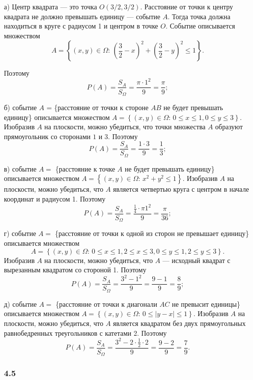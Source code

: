 \documentclass{book}
\begin{document}
а) Центр квадрата --- это точка $ O \left( 3/2, 3/2 \right) $.
Расстояние от точки к центру квадрата не должно превышать единицу --- событие $A$.
Тогда точка должна находиться в круге с радиусом 1 и центром в точке $O$.
Событие описывается множеством
$$A =
\left\{ \left( x, y \right) \in \Omega: \,
\left( \frac{3}{2} - x \right)^2 + \left( \frac{3}{2} - y \right)^2 \leq 1 \right\}.$$

Поэтому
$$P \left( A \right) =
\frac{S_A}{S_{ \Omega }} =
\frac{ \pi \cdot 1^2}{9} =
\frac{ \pi }{9};$$

б) событие $A$ =
\{расстояние от точки к стороне $AB$ не будет превышать единицу\}
описывается множеством $A = \left\{ \left( x, y \right) \in \Omega: \, 0 \leq x \leq 1, 0 \leq y \leq 3 \right\} $.
Изобразив $A$ на плоскости, можно убедиться, что точки множества $A$ образуют прямоугольник со сторонами $1$ и $3$.
Поэтому
$$P \left( A \right) =
\frac{S_A}{S_{ \Omega }} =
\frac{1 \cdot 3}{9} =
\frac{1}{3};$$

в) событие $A =$
\{расстояние к точке $A$ не будет превышать единицу\}
описывается множеством $A =\left\{ \left( x, y \right) \in \Omega: \, x^2 + y^2 \leq 1 \right\} $.
Изобразив $A$ на плоскости, можно убедиться, что $A$ является четвертью круга с центром в начале координат и радиусом 1.
Поэтому
$$P \left( A \right) =
\frac{S_A}{S_{ \Omega }}=
\frac{ \frac{1}{4} \cdot \pi 1^2}{9} =
\frac{ \pi }{36};$$

г) событие $A =$
\{расстояние от точки к одной из сторон не превышает единицу\}
описывается множеством
$$A =
\left\{ \left( x, y \right) \in \Omega: \,
0 \leq x \leq 1,
2 \leq x \leq 3,
0 \leq y \leq 1,
2 \leq y \leq 3 \right\}.$$
Изобразив $A$ на плоскости, можно убедиться, что $A$ --- исходный квадрат с вырезанным квадратом со стороной 1.
Поэтому
$$P \left( A \right) =
\frac{S_A}{S_{ \Omega }} =
\frac{3^2 - 1^2}{9} =
\frac{9-1}{9} =
\frac{8}{9};$$

д) событие $A =$
\{расстояние от точки к диагонали $AC$ не превысит единицы\}
описывается множеством $A = \left\{ \left( x, y \right) \in \Omega: \, 0 \leq \left| y - x \right| \leq 1 \right\}$.
Изобразив $A$ на плоскости, можно убедиться,
что $A$ является квадратом без двух прямоугольных равнобедренных треугольников с катетами 2.
Поэтому
$$P \left( A \right) =
\frac{S_A}{S_{ \Omega }} =
\frac{3^2 - 2 \cdot \frac{1}{2} \cdot 2}{9} =
\frac{9 - 2}{9} =
\frac{7}{9}.$$

\subsubsection*{4.5}
\end{document}
